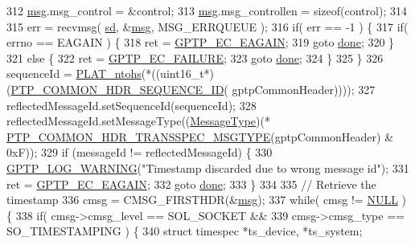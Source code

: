 \begin{DoxyCode}
312     \hyperlink{maap__log__linux_8c_a0c7e58a50354c4a4d6dad428d0e47029}{msg}.msg\_control = &control;
313     \hyperlink{maap__log__linux_8c_a0c7e58a50354c4a4d6dad428d0e47029}{msg}.msg\_controllen = \textcolor{keyword}{sizeof}(control);
314 
315     err = recvmsg( \hyperlink{class_linux_timestamper_generic_a06b0afe769d54ae94259d8532bc878b0}{sd}, &\hyperlink{maap__log__linux_8c_a0c7e58a50354c4a4d6dad428d0e47029}{msg}, MSG\_ERRQUEUE );
316     \textcolor{keywordflow}{if}( err == -1 ) \{
317         \textcolor{keywordflow}{if}( errno == EAGAIN ) \{
318             ret = \hyperlink{ieee1588_8hpp_aee74e806e4f7deb78c6adee61f5dac87}{GPTP\_EC\_EAGAIN};
319             \textcolor{keywordflow}{goto} \hyperlink{mrp_validate_8c_a5992b274cfdcacdbc1fa8347fd01ebde}{done};
320         \}
321         \textcolor{keywordflow}{else} \{
322             ret = \hyperlink{ieee1588_8hpp_ab75a746f471bd4537a099d86b38d78c1}{GPTP\_EC\_FAILURE};
323             \textcolor{keywordflow}{goto} \hyperlink{mrp_validate_8c_a5992b274cfdcacdbc1fa8347fd01ebde}{done};
324         \}
325     \}
326     sequenceId = \hyperlink{linux_2src_2platform_8cpp_a6b8f3e7b87b66fa774a07ddc67f883a7}{PLAT\_ntohs}(*((uint16\_t*)(\hyperlink{avbts__message_8hpp_af717ee08477f9388e66fc5451971e6af}{PTP\_COMMON\_HDR\_SEQUENCE\_ID}(
      gptpCommonHeader))));
327     reflectedMessageId.setSequenceId(sequenceId);
328     reflectedMessageId.setMessageType((\hyperlink{avbts__message_8hpp_ac6606ebe91c8ac66a2c314c79f5ab013}{MessageType})(*
      \hyperlink{avbts__message_8hpp_a102fc939e55e08eadb9bf42508fb65d2}{PTP\_COMMON\_HDR\_TRANSSPEC\_MSGTYPE}(gptpCommonHeader) & 0xF));
329     \textcolor{keywordflow}{if} (messageId != reflectedMessageId) \{
330         \hyperlink{gptp__log_8hpp_af167ce4fe92c399b212449dfb071a3f5}{GPTP\_LOG\_WARNING}(\textcolor{stringliteral}{"Timestamp discarded due to wrong message id"});
331         ret = \hyperlink{ieee1588_8hpp_aee74e806e4f7deb78c6adee61f5dac87}{GPTP\_EC\_EAGAIN};
332         \textcolor{keywordflow}{goto} \hyperlink{mrp_validate_8c_a5992b274cfdcacdbc1fa8347fd01ebde}{done};
333     \}
334 
335     \textcolor{comment}{// Retrieve the timestamp}
336     cmsg = CMSG\_FIRSTHDR(&\hyperlink{maap__log__linux_8c_a0c7e58a50354c4a4d6dad428d0e47029}{msg});
337     \textcolor{keywordflow}{while}( cmsg != \hyperlink{openavb__types__base__pub_8h_a070d2ce7b6bb7e5c05602aa8c308d0c4}{NULL} ) \{
338         \textcolor{keywordflow}{if}( cmsg->cmsg\_level == SOL\_SOCKET &&
339             cmsg->cmsg\_type == SO\_TIMESTAMPING ) \{
340             \textcolor{keyword}{struct }timespec *ts\_device, *ts\_system;

\end{DoxyCode}
